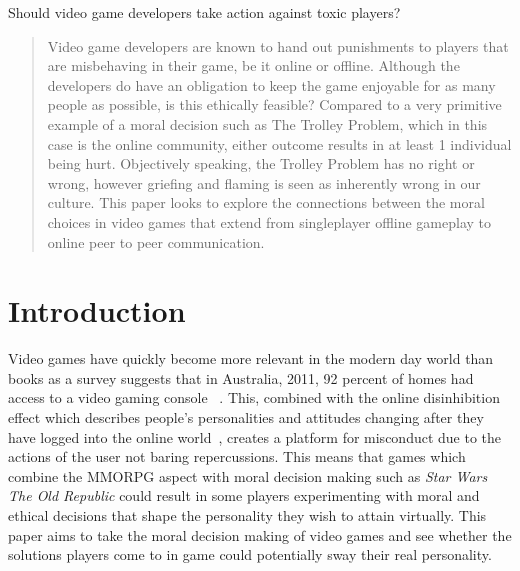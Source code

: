 \documentclass[12pt]{article}
\begin{document}
\maketitle
Should video game developers take action against toxic players?

\begin{abstract}
Video game developers are known to hand out punishments to players that are misbehaving in their game, be it online or offline. Although the developers do have an obligation to keep the game enjoyable for as many people as possible, is this ethically feasible? Compared to a very primitive example of a moral decision such as The Trolley Problem, which in this case is the online community, either outcome results in at least 1 individual being hurt. Objectively speaking, the Trolley Problem has no right or wrong, however griefing and flaming is seen as inherently wrong in our culture. This paper looks to explore the connections between the moral choices in video games that extend from singleplayer offline gameplay to online peer to peer communication.
\end{abstract}


\section{Introduction}
Video games have quickly become more relevant in the modern day world than books as a survey suggests that in Australia, 2011, 92 percent of homes had access to a video gaming console
~\cite{Martin:2011:PGE:2071536.2071566}. This, combined with the online disinhibition effect which describes people's personalities and attitudes changing after they have logged into the online world~\cite{Zim}, creates a platform for misconduct due to the actions of the user not baring repercussions. This means that games which combine the MMORPG aspect with moral decision making such as \textit{Star Wars The Old Republic} could result in some players experimenting with moral and ethical decisions that shape the personality they wish to attain virtually. This paper aims to take the moral decision making of video games and see whether the solutions players come to in game could potentially sway their real personality.
\end{document}
